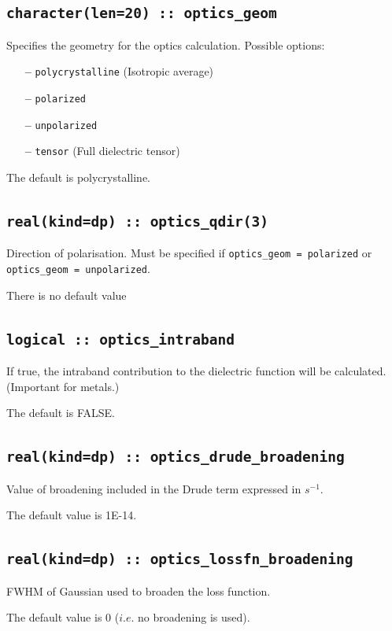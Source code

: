 \documentclass[a4paper,11pt,twoside]{book}
\begin{document}
{\subsection[optics\_geom]{\tt character(len=20) :: optics\_geom}

Specifies the geometry for the optics calculation.  Possible options:
\begin{itemize}
\item[{\bf --}]  \verb#polycrystalline# (Isotropic average)
\item[{\bf --}]  \verb#polarized#
\item[{\bf --}]  \verb#unpolarized#
\item[{\bf --}]  \verb#tensor# (Full dielectric tensor)
\end{itemize}
The default is polycrystalline.

\subsection[optics\_qdir]{\tt real(kind=dp) :: optics\_qdir(3)}
Direction of polarisation. Must be specified if \verb#optics_geom = polarized#
or \verb#optics_geom = unpolarized#.

There is no default value

\subsection[optics\_intraband]{\tt logical :: optics\_intraband}
If true, the intraband contribution to the dielectric function will be calculated.  (Important for metals.)

The default is FALSE.

\subsection[optics\_drude\_broadening]{\tt real(kind=dp) :: optics\_drude\_broadening}
Value of broadening included in the Drude term expressed in $s^{-1}$.

The default value is 1E-14.

\subsection[optics\_lossfn\_broadening]{\tt real(kind=dp) :: optics\_lossfn\_broadening}
FWHM of Gaussian used to broaden the loss function.

The default value is 0 ($i.e.$ no broadening is used).


}
\end{document}
